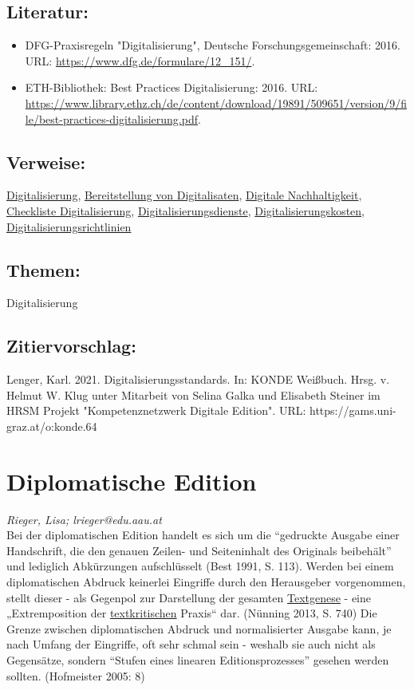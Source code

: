 \documentclass{article}
\begin{document}
        \subsection*{Literatur:}\begin{itemize}\item DFG-Praxisregeln "Digitalisierung", Deutsche Forschungsgemeinschaft: 2016. URL: \url{https://www.dfg.de/formulare/12_151/}.\item ETH-Bibliothek: Best Practices Digitalisierung: 2016. URL: \url{https://www.library.ethz.ch/de/content/download/19891/509651/version/9/file/best-practices-digitalisierung.pdf}.\end{itemize}\subsection*{Verweise:}\href{https://gams.uni-graz.at/o:konde.60}{Digitalisierung}, \href{https://gams.uni-graz.at/o:konde.36}{Bereitstellung von Digitalisaten}, \href{https://gams.uni-graz.at/o:konde.6}{Digitale Nachhaltigkeit}, \href{https://gams.uni-graz.at/o:konde.40}{Checkliste Digitalisierung}, \href{https://gams.uni-graz.at/o:konde.61}{Digitalisierungsdienste}, \href{https://gams.uni-graz.at/o:konde.62}{Digitalisierungskosten}, \href{https://gams.uni-graz.at/o:konde.63}{Digitalisierungsrichtlinien}\subsection*{Themen:}Digitalisierung\subsection*{Zitiervorschlag:}Lenger, Karl. 2021. Digitalisierungsstandards. In: KONDE Weißbuch. Hrsg. v. Helmut W. Klug unter Mitarbeit von Selina Galka und Elisabeth Steiner im HRSM Projekt "Kompetenznetzwerk Digitale Edition". URL: https://gams.uni-graz.at/o:konde.64\newpage\section*{Diplomatische Edition} \emph{Rieger, Lisa; lrieger@edu.aau.at }\\
        
    Bei der diplomatischen Edition handelt es sich um die “gedruckte Ausgabe einer
                  Handschrift, die den genauen Zeilen- und Seiteninhalt des Originals beibehält” und
                  lediglich Abkürzungen aufschlüsselt (Best 1991, S. 113). Werden bei
                  einem diplomatischen Abdruck keinerlei Eingriffe durch den Herausgeber
                  vorgenommen, stellt dieser - als Gegenpol zur Darstellung der gesamten \href{http://gams.uni-graz.at/o:konde.28}{Textgenese} - eine „Extremposition
                  der \href{http://gams.uni-graz.at/o:konde.192}{textkritischen} Praxis“ dar.
                     (Nünning 2013, S. 740) Die Grenze zwischen diplomatischen Abdruck
                  und normalisierter Ausgabe kann, je nach Umfang der Eingriffe, oft sehr schmal
                  sein - weshalb sie auch nicht als Gegensätze, sondern “Stufen eines linearen
                  Editionsprozesses” gesehen werden sollten. (Hofmeister 2005: 8)\\
            
\end{document}
